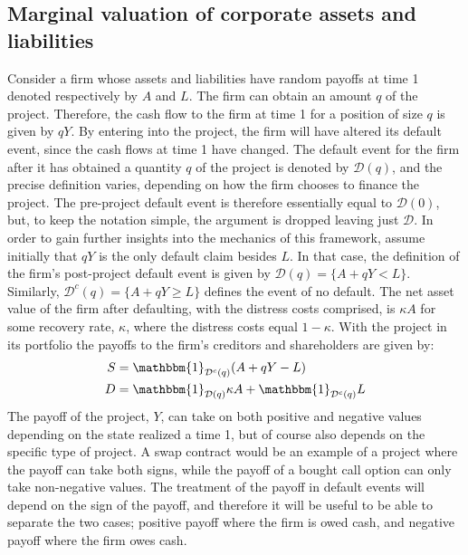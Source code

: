 \documentclass[../main.tex]{subfiles}
\begin{document}
    \subsection{Marginal valuation of corporate assets and liabilities}
        Consider a firm whose assets and liabilities have random payoffs at time 1 denoted respectively by $A$ and $L$.  
        The firm can obtain an amount $q$ of the project.
        Therefore, the cash flow to the firm at time 1 for a position of size $q$ is given by $qY$.
        By entering into the project, the firm will have altered its default event,
        since the cash flows at time 1 have changed.
        The default event for the firm after it has obtained a quantity $q$ of the project
        is denoted by $\mathcal{D}(q)$, and the precise definition varies,
        depending on how the firm chooses to finance the project.
        The pre-project default event is therefore essentially equal to $\mathcal{D}(0)$,
        but, to keep the notation simple, the argument is dropped leaving just $\mathcal{D}$.
        In order to gain further insights into the mechanics of this framework, 
        assume initially that $qY$ is the only default claim besides $L$. 
        In that case, the definition of the firm's post-project default event is given by 
        $\mathcal{D}(q) = \{A + qY < L\}$.
        Similarly, $\mathcal{D}^{c}(q) = \{A + qY \geq L\}$ defines the event of no default.
        The net asset value of the firm after defaulting, with the distress costs comprised, is $\kappa A$ for some recovery rate, $\kappa$, where the distress costs equal $1-\kappa$.
        With the project in its portfolio the payoffs to the firm's creditors and shareholders are given by:
            \begin{align}
                S 
                &= 
                \mathbbm{1}_{\mathcal{D}^{c}(q)}
                (A + qY - L)
                \\
                D 
                &= 
                \mathbbm{1}_{\mathcal{D}(q)}
                \kappa A 
                + 
                \mathbbm{1}_{\mathcal{D}^{c}(q)} 
                L
            \end{align}
        The payoff of the project, $Y$, can take on both positive and negative values
        depending on the state realized a time 1, 
        but of course also depends on the specific type of project. 
        A swap contract would be an example of a project where the payoff can take both signs,
        while the payoff of a bought call option can only take non-negative values.
        The treatment of the payoff in default events will depend on the sign of the payoff,
        and therefore it will be useful to be able to separate the two cases;
        positive payoff where the firm is owed cash,
        and negative payoff where the firm owes cash.
\end{document}
